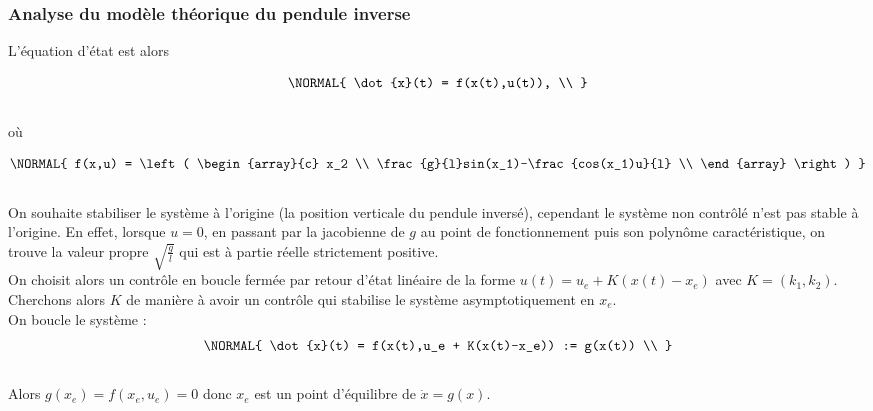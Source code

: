 \documentclass[11pt,french]{article} %
\begin{document}
\subsubsection{Analyse du modèle théorique du pendule inverse}

L'équation d'état est alors

\begin{equation}
	\NORMAL{
			\dot{x}(t) = f(x(t),u(t)), \\
	}
\end{equation}\\

où 

\begin{equation}
	\NORMAL{
		f(x,u) = 
		\left(
		\begin{array}{c}
			x_2 \\
			\frac{g}{l}sin(x_1)-\frac{cos(x_1)u}{l} \\
    \end{array}
  \right)
	}
\end{equation}\\


On souhaite stabiliser le système à l'origine (la position verticale du pendule inversé), cependant le système non contrôlé n'est pas stable à l'origine. En effet, lorsque $u = 0$, en passant par la jacobienne de $g$ au point de fonctionnement puis son polynôme caractéristique, on trouve la valeur propre $\sqrt{\frac{g}{l}}$ qui est à partie réelle strictement positive.\\


On choisit alors un contrôle en boucle fermée par retour d'état linéaire de la forme $u(t) = u_e + K(x(t) - x_e)$ avec $K = (k_1, k_2)$. Cherchons alors $K$ de manière à avoir un contrôle qui stabilise le système asymptotiquement en $x_e$.\\

On boucle le système :\\

\begin{equation}
	\NORMAL{
			\dot{x}(t) = f(x(t),u_e + K(x(t)-x_e)) := g(x(t)) \\
	}
\end{equation}\\

Alors $g(x_e) = f(x_e, u_e) = 0$ donc $x_e$ est un point d'équilibre de $\dot{x} = g(x)$. \\
\end{document}
